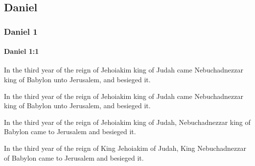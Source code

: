 \subsection{Daniel}
	\label{DANIEL}

	\subsubsection{Daniel 1} %
		\label{DANIEL-1}

		\paragraph{Daniel 1:1} %
			\label{DANIEL-1-1}

			In the third year of the reign of Jehoiakim king of Judah came Nebuchadnezzar king of Babylon unto Jerusalem, and besieged it.

			\begin{versebox}
					\item[BHS] 
					\item[LXX] 
					\item[ASV] In the third year of the reign of Jehoiakim king of Judah came Nebuchadnezzar king of Babylon unto Jerusalem, and besieged it.
					\item[NIV] In the third year of the reign of Jehoiakim king of Judah, Nebuchadnezzar king of Babylon came to Jerusalem and besieged it.
					\item[NRSV] In the third year of the reign of King Jehoiakim of Judah, King Nebuchadnezzar of Babylon came to Jerusalem and besieged it.
			\end{versebox}

